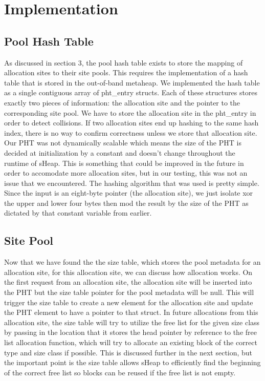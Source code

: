 \documentclass[conference]{IEEEtran}
\begin{document}
\section{Implementation}

\subsection{Pool Hash Table}
As discussed in section 3, the pool hash table exists to store the mapping of 
allocation sites to their site pools. This requires the implementation of a hash 
table that is stored in the out-of-band metaheap. We implemented the hash table as 
a single contiguous array of pht\_entry structs. Each of these structures stores 
exactly two pieces of information: the allocation site and the pointer to the 
corresponding site pool. We have to store the allocation site in the pht\_entry in 
order to detect collisions. If two allocation sites end up hashing to the same 
hash index, there is no way to confirm correctness unless we store that allocation 
site. Our PHT was not dynamically scalable which means the size of the PHT is 
decided at initialization by a constant and doesn’t change throughout the runtime 
of sHeap. This is something that could be improved in the future in order to 
accomodate more allocation sites, but in our testing, this was not an issue that 
we encountered. The hashing algorithm that was used is pretty simple. Since the 
input is an eight-byte pointer (the allocation site), we just isolate xor the 
upper and lower four bytes then mod the result by the size of the PHT as 
dictated by that constant variable from earlier.

\subsection{Site Pool}
Now that we have found the the size table, which stores the pool metadata for an 
allocation site, for this allocation site, we can discuss how allocation works. 
On the first request from an allocation site, the allocation site will be 
inserted into the PHT but the size table pointer for the pool metadata will be 
null. This will trigger the size table to create a new element for the 
allocation site and update the PHT element to have a pointer to that struct. In 
future allocations from this allocation site, the size table will try to utilize 
the free list for the given size class by passing in the location that it stores 
the head pointer by reference to the free list allocation function, which will 
try to allocate an existing block of the correct type and size class if possible. 
This is discussed further in the next section, but the important point is the size 
table allows sHeap to efficiently find the beginning of the correct free list so 
blocks can be reused if the free list is not empty. 
\end{document}
